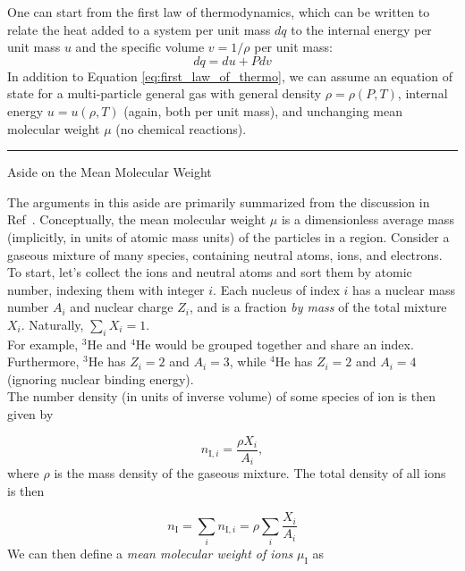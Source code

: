\documentclass[12pt]{article}
\begin{document}
One can start from the first law of thermodynamics, which can be written to relate the heat added to a system per unit mass $dq$ to the internal energy per unit mass $u$ and the specific volume $v = 1/\rho$ per unit mass:
\begin{equation}
    dq = du + Pdv \label{eq:first_law_of_thermo}
\end{equation}
%
In addition to Equation \ref{eq:first_law_of_thermo}, we can assume an equation of state for a multi-particle general gas with general density $\rho = \rho(P,T)$, internal energy $u = u(\rho,T)$ (again, both per unit mass), and unchanging mean molecular weight $\mu$ (no chemical reactions). 

\vspace{0.25cm}
\hrule
\begin{center}
    Aside on the Mean Molecular Weight
\end{center}

The arguments in this aside are primarily summarized from the discussion in Ref~\cite{HK_book}. Conceptually, the mean molecular weight $\mu$ is a dimensionless average mass (implicitly, in units of atomic mass units) of the particles in a region. Consider a gaseous mixture of many species, containing neutral atoms, ions, and electrons. To start, let's collect the ions and neutral atoms and sort them by atomic number, indexing them with integer $i$. Each nucleus of index $i$ has a nuclear mass number $A_i$ and nuclear charge $Z_i$, and is a fraction \textit{by mass} of the total mixture $X_i$. Naturally, $\sum_i X_i = 1$. \\

For example, $^3$He and $^4$He would be grouped together and share an index. Furthermore, $^3$He has $Z_i = 2$ and $A_i = 3$, while $^4$He has $Z_i = 2$ and $A_i = 4$ (ignoring nuclear binding energy). \\
%
The number density (in units of inverse volume) of some species of ion is then given by 

\begin{equation}
    n_{\mathrm{I},i} = \frac{\rho X_i}{A_i},
\end{equation}
%
where $\rho$ is the mass density of the gaseous mixture. The total density of all ions is then

\begin{equation}
    n_\mathrm{I} = \sum_i n_{\mathrm{I},i} = \rho \sum_i \frac{X_i}{A_i}
\end{equation}
%
We can then define a \textit{mean molecular weight of ions} $\mu_\mathrm{I}$ as 
\end{document}
